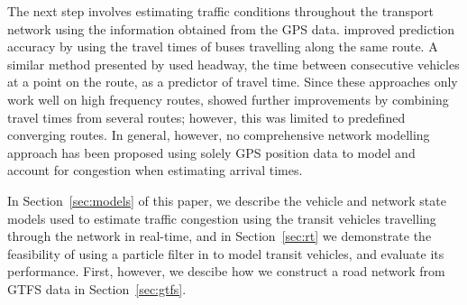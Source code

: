The next step involves estimating traffic conditions throughout the transport network
using the information obtained from the GPS data. 
\cite{Yu_2010} improved prediction accuracy by using the travel times
of buses travelling along the same route.
A similar method presented by \cite{Hans_2015}
used headway, the time between consecutive vehicles at a point on the route,
as a predictor of travel time.
Since these approaches only work well on high frequency routes,
\cite{Yu_2011} showed further improvements by combining travel times 
from several routes;
however, this was limited to predefined converging routes.
In general, however, no comprehensive network modelling approach has been proposed using
solely GPS position data to model and account for congestion when estimating arrival times.


In Section~\ref{sec:models} of this paper, 
we describe the \rt vehicle and network state models
used to estimate traffic congestion using the transit vehicles
travelling through the network in real-time,
and in Section~\ref{sec:rt} we demonstrate the feasibility of using a particle filter
in \rt to model transit vehicles,
and evaluate its performance.
First, however, we descibe how we construct a
road network from GTFS data in Section~\ref{sec:gtfs}.



